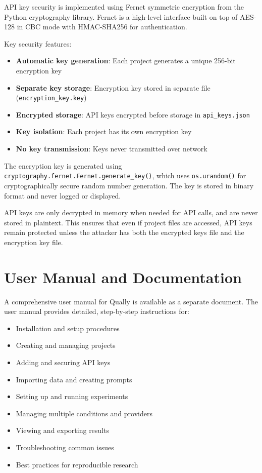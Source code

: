 \documentclass[11pt,a4paper]{article}
\begin{document}
API key security is implemented using Fernet symmetric encryption from the Python cryptography library. Fernet is a high-level interface built on top of AES-128 in CBC mode with HMAC-SHA256 for authentication.

Key security features:
\begin{itemize}
    \item \textbf{Automatic key generation}: Each project generates a unique 256-bit encryption key
    \item \textbf{Separate key storage}: Encryption key stored in separate file (\texttt{encryption\_key.key})
    \item \textbf{Encrypted storage}: API keys encrypted before storage in \texttt{api\_keys.json}
    \item \textbf{Key isolation}: Each project has its own encryption key
    \item \textbf{No key transmission}: Keys never transmitted over network
\end{itemize}

The encryption key is generated using \texttt{cryptography.fernet.Fernet.generate\_key()}, which uses \texttt{os.urandom()} for cryptographically secure random number generation. The key is stored in binary format and never logged or displayed.

API keys are only decrypted in memory when needed for API calls, and are never stored in plaintext. This ensures that even if project files are accessed, API keys remain protected unless the attacker has both the encrypted keys file and the encryption key file.

\section{User Manual and Documentation}
\label{sec:manual}

A comprehensive user manual for Qually is available as a separate document. The user manual provides detailed, step-by-step instructions for:

\begin{itemize}
    \item Installation and setup procedures
    \item Creating and managing projects
    \item Adding and securing API keys
    \item Importing data and creating prompts
    \item Setting up and running experiments
    \item Managing multiple conditions and providers
    \item Viewing and exporting results
    \item Troubleshooting common issues
    \item Best practices for reproducible research
\end{itemize}
\end{document}

